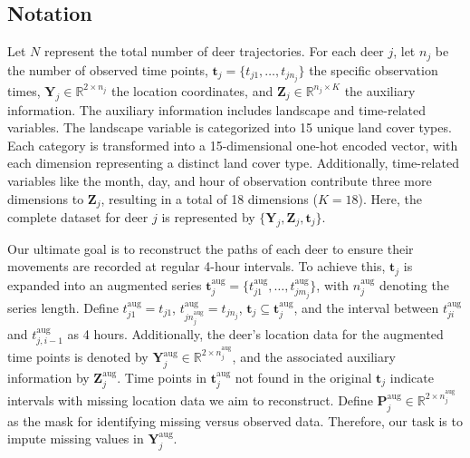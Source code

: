 \documentclass[11pt]{article}
\begin{document}
\subsection{Notation}
Let $N$ represent the total number of deer trajectories. For each deer $j$, let $n_j$ be the number of observed time points, $\bm{t}_j = \{t_{j1}, \ldots, t_{jn_j}\}$ the specific observation times, $\bm{Y}_j \in \mathbb{R}^{2 \times n_j}$ the location coordinates, and $\bm{Z}_j \in \mathbb{R}^{n_j \times K}$ the auxiliary information. The auxiliary information includes landscape and time-related variables. The landscape variable is categorized into 15 unique land cover types. Each category is transformed into a 15-dimensional one-hot encoded vector, with each dimension representing a distinct land cover type. Additionally, time-related variables like the month, day, and hour of observation contribute three more dimensions to $\bm{Z}_j$, resulting in a total of 18 dimensions ($K=18$). Here, the complete dataset for deer $j$ is represented by $\{\bm{Y}_j, \bm{Z}_j, \bm{t}_j\}$.


Our ultimate goal is to reconstruct the paths of each deer to ensure their movements are recorded at regular 4-hour intervals. To achieve this, $\bm{t}_j$ is expanded into an augmented series $\bm{t}_j^{\mathrm{aug}}=\{t_{j1}^{\mathrm{aug}},\ldots,t_{jm_j}^{\mathrm{aug}}\}$, with $n_j^{\mathrm{aug}}$ denoting the series length. Define $t_{j1}^{\mathrm{aug}}=t_{j1}$, $t_{jn_j^{\mathrm{aug}}}^{\mathrm{aug}}=t_{jn_j}$, $\bm{t}_j\subseteq \bm{t}_j^{\mathrm{aug}}$, and the interval between $t_{ji}^{\mathrm{aug}}$ and $t_{j,i-1}^{\mathrm{aug}}$ as 4 hours. Additionally, the deer's location data for the augmented time points is denoted by $\bm{Y}_j^{\mathrm{aug}}\in \mathbb{R}^{2\times n_j^{\mathrm{aug}}}$, and the associated auxiliary information by $\bm{Z}_j^{\mathrm{aug}}$. Time points in $\bm{t}_j^{\mathrm{aug}}$ not found in the original $\bm{t}_j$ indicate intervals with missing location data we aim to reconstruct. Define $\bm{P}_j^{\mathrm{aug}}\in \mathbb{R}^{2\times n_j^{\mathrm{aug}}}$ as the mask for identifying missing versus observed data. Therefore, our task is to impute missing values in $\bm{Y}_j^{\mathrm{aug}}$.
\end{document}
